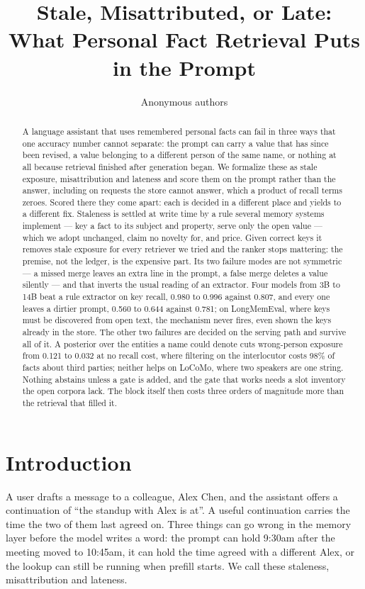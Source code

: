 \documentclass{article} %
\title{Stale, Misattributed, or Late: What Personal Fact Retrieval Puts in the Prompt}
\author{Anonymous authors}
\begin{document}
\maketitle

\begin{abstract}
A language assistant that uses remembered personal facts can fail in three ways that one accuracy number cannot separate: the prompt can carry a value that has since been revised, a value belonging to a different person of the same name, or nothing at all because retrieval finished after generation began. We formalize these as stale exposure, misattribution and lateness and score them on the prompt rather than the answer, including on requests the store cannot answer, which a product of recall terms zeroes. Scored there they come apart: each is decided in a different place and yields to a different fix. Staleness is settled at write time by a rule several memory systems implement --- key a fact to its subject and property, serve only the open value --- which we adopt unchanged, claim no novelty for, and price. Given correct keys it removes stale exposure for every retriever we tried and the ranker stops mattering: the premise, not the ledger, is the expensive part. Its two failure modes are not symmetric --- a missed merge leaves an extra line in the prompt, a false merge deletes a value silently --- and that inverts the usual reading of an extractor. Four models from 3B to 14B beat a rule extractor on key recall, 0.980 to 0.996 against 0.807, and every one leaves a dirtier prompt, 0.560 to 0.644 against 0.781; on LongMemEval, where keys must be discovered from open text, the mechanism never fires, even shown the keys already in the store. The other two failures are decided on the serving path and survive all of it. A posterior over the entities a name could denote cuts wrong-person exposure from 0.121 to 0.032 at no recall cost, where filtering on the interlocutor costs 98\% of facts about third parties; neither helps on LoCoMo, where two speakers are one string. Nothing abstains unless a gate is added, and the gate that works needs a slot inventory the open corpora lack. The block itself then costs three orders of magnitude more than the retrieval that filled it.
\end{abstract}

\section{Introduction}

A user drafts a message to a colleague, Alex Chen, and the assistant offers a continuation of ``the standup with Alex is at''. A useful continuation carries the time the two of them last agreed on. Three things can go wrong in the memory layer before the model writes a word: the prompt can hold 9:30am after the meeting moved to 10:45am, it can hold the time agreed with a different Alex, or the lookup can still be running when prefill starts. We call these staleness, misattribution and lateness.
\end{document}
